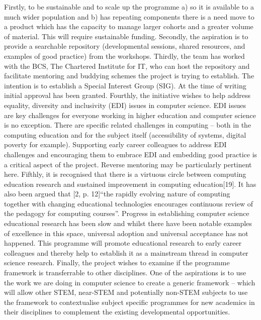 \documentclass[sigconf]{acmart}
\begin{document}
Firstly, to be sustainable and to scale up the programme a) so it is available to a much wider population and b) has repeating components there is a need move to a product which has the capacity to manage larger cohorts and a greater volume of material. This will require sustainable funding. Secondly, the aspiration is to provide a searchable repository (developmental sessions, shared resources, and examples of good practice) from the workshops. Thirdly, the team has worked with the BCS, The Chartered Institute for IT, who can host the repository and facilitate mentoring and buddying schemes the project is trying to establish. The intention is to establish a Special Interest Group (SIG).  At the time of writing initial approval has been granted. Fourthly, the initiative wishes to help address equality, diversity and inclusivity (EDI) issues in computer science. EDI issues are key challenges for everyone working in higher education and computer science is no exception. There are specific related challenges in computing – both in the computing education and for the subject itself (accessibility of systems, digital poverty for example). Supporting early career colleagues to address EDI challenges and encouraging them to embrace EDI and embedding good practice is a critical aspect of the project. Reverse mentoring may be particularly pertinent here. Fifthly, it is recognised that there is a virtuous circle between computing education research and sustained improvement in computing education[19]. It has also been argued that [2, p. 12]“the rapidly evolving nature of computing together with changing educational technologies encourages continuous review of the pedagogy for computing courses”. Progress in establishing computer science educational research has been slow and whilst there have been notable examples of excellence in this space, universal adoption and universal acceptance has not happened. This programme will promote educational research to early career colleagues and thereby help to establish it as a mainstream thread in computer science research. Finally, the project wishes to examine if the programme framework is transferrable to other disciplines. One of the aspirations is to use the work we are doing in computer science to create a generic framework – which will allow other STEM, near-STEM and potentially non-STEM subjects to use the framework to contextualise subject specific programmes for new academics in their disciplines to complement the existing developmental opportunities. 
\end{document}
